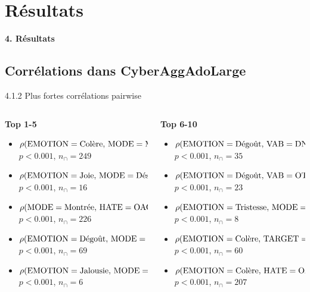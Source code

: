 \documentclass[aspectratio=169,10pt,xcolor=table]{beamer}
\newcommand{\pval}[1]{\ensuremath{#1}}
\newcommand{\pos}[1]{\textcolor{Positive}{#1}}
\newcommand{\negcorr}[1]{\textcolor{Negative}{#1}}
\newcommand{\rhoitem}[7]{\item \(\rho(\mathrm{#1}=\text{#2},\,\mathrm{#3}=\text{#4}) = #5\)\\[-0.15em]{\tiny \(p\pval{#6}\), \(n_{\cap}=#7\)}}
\begin{document}
\section{Résultats}

\begin{frame}
  \begin{center}
    {\LARGE\bfseries 4. Résultats}\par
  \end{center}
\end{frame}

\subsection{Corrélations dans CyberAggAdoLarge}


\begin{frame}{4.1.2 Plus fortes corrélations pairwise}
\scriptsize
\begin{columns}[T,onlytextwidth]
\begin{column}{0.49\textwidth}
\textbf{Top 1-5}
\begin{itemize}
\setlength\itemsep{0.55em}
\rhoitem{EMOTION}{Colère}{MODE}{Montrée}{\pos{0.75}}{<0.001}{249}
\rhoitem{EMOTION}{Joie}{MODE}{Désignée}{\pos{0.36}}{<0.001}{16}
\rhoitem{MODE}{Montrée}{HATE}{OAG}{\pos{0.33}}{<0.001}{226}
\rhoitem{EMOTION}{Dégoût}{MODE}{Montrée}{\pos{0.33}}{<0.001}{69}
\rhoitem{EMOTION}{Jalousie}{MODE}{Désignée}{\pos{0.32}}{<0.001}{6}
\end{itemize}
\end{column}
\begin{column}{0.49\textwidth}
\textbf{Top 6-10}
\begin{itemize}
\setlength\itemsep{0.55em}
\rhoitem{EMOTION}{Dégoût}{VAB}{DNG}{\pos{0.30}}{<0.001}{35}
\rhoitem{EMOTION}{Dégoût}{VAB}{OTH}{\negcorr{-0.28}}{<0.001}{23}
\rhoitem{EMOTION}{Tristesse}{MODE}{Suggérée}{\pos{0.27}}{<0.001}{8}
\rhoitem{EMOTION}{Colère}{TARGET}{victim}{\negcorr{-0.27}}{<0.001}{60}
\rhoitem{EMOTION}{Colère}{HATE}{OAG}{\pos{0.26}}{<0.001}{207}
\end{itemize}
\end{column}
\end{columns}
\end{frame}
\end{document}
